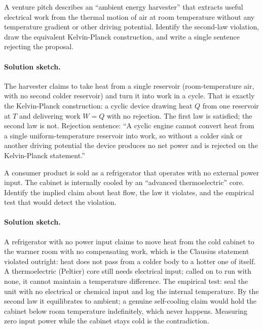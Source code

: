 \begin{exercise}
A venture pitch describes an ``ambient energy harvester'' that
extracts useful electrical work from the thermal motion of air at
room temperature without any temperature gradient or other driving
potential. Identify the second-law violation, draw the equivalent
Kelvin-Planck construction, and write a single sentence rejecting the
proposal.
\paragraph{Solution sketch.} The harvester claims to take heat from a
single reservoir (room-temperature air, with no second colder
reservoir) and turn it into work in a cycle. That is exactly the
Kelvin-Planck construction: a cyclic device drawing heat $Q$ from one
reservoir at $T$ and delivering work $W = Q$ with no rejection. The
first law is satisfied; the second law is not. Rejection sentence: ``A
cyclic engine cannot convert heat from a single uniform-temperature
reservoir into work, so without a colder sink or another driving
potential the device produces no net power and is rejected on the
Kelvin-Planck statement.''
\end{exercise}

\begin{exercise}
A consumer product is sold as a refrigerator that operates with no
external power input. The cabinet is internally cooled by an
``advanced thermoelectric'' core. Identify the implied claim about
heat flow, the law it violates, and the empirical test that would
detect the violation.
\paragraph{Solution sketch.} A refrigerator with no power input claims
to move heat from the cold cabinet to the warmer room with no
compensating work, which is the Clausius statement violated outright:
heat does not pass from a colder body to a hotter one of itself. A
thermoelectric (Peltier) core still needs electrical input; called on
to run with none, it cannot maintain a temperature difference. The
empirical test: seal the unit with no electrical or chemical input and
log the internal temperature. By the second law it equilibrates to
ambient; a genuine self-cooling claim would hold the cabinet below room
temperature indefinitely, which never happens. Measuring zero input
power while the cabinet stays cold is the contradiction.
\end{exercise}

